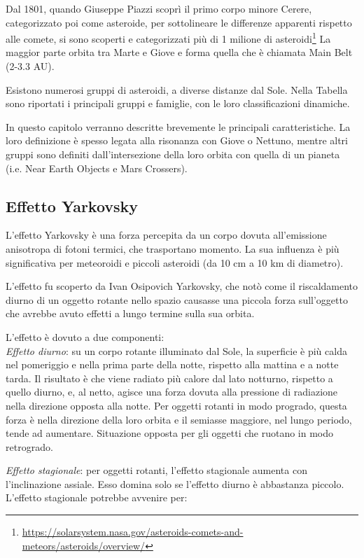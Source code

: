 \documentclass[a4paper,11pt,openright]{book}
\begin{document}
Dal 1801, quando Giuseppe Piazzi scoprì il primo corpo minore Cerere, categorizzato poi come asteroide, per sottolineare le differenze apparenti rispetto alle comete, si sono scoperti e categorizzati più di 1 milione di asteroidi\footnote{\href{https://solarsystem.nasa.gov/asteroids-comets-and-meteors/asteroids/overview/}{https://solarsystem.nasa.gov/asteroids-comets-and-meteors/asteroids/overview/}} La maggior parte orbita tra Marte e Giove e forma quella che è chiamata Main Belt (2-3.3 AU).

Esistono numerosi gruppi di asteroidi, a diverse distanze dal Sole. Nella Tabella sono riportati i principali gruppi e famiglie, con le loro classificazioni dinamiche.

In questo capitolo verranno descritte brevemente le principali caratteristiche. La loro definizione è spesso legata alla risonanza con Giove o Nettuno, mentre altri gruppi sono definiti dall'intersezione della loro orbita con quella di un pianeta (i.e. Near Earth Objects e Mars Crossers).

\subsection{Effetto Yarkovsky} %
L’effetto Yarkovsky è una forza percepita da un corpo dovuta all’emissione anisotropa di fotoni termici, che trasportano momento. La sua influenza è più significativa per meteoroidi e piccoli asteroidi (da 10 cm a 10 km di diametro).

L’effetto fu scoperto da Ivan Osipovich Yarkovsky, che notò come il riscaldamento diurno di un oggetto rotante nello spazio causasse una piccola forza sull’oggetto che avrebbe avuto effetti a lungo termine sulla sua orbita.

L’effetto è dovuto a due componenti:\\
\textit{Effetto diurno}: su un corpo rotante illuminato dal Sole, la superficie è più calda nel pomeriggio e nella prima parte della notte, rispetto alla mattina e a notte tarda. Il risultato è che viene radiato più calore dal lato notturno, rispetto a quello diurno, e, al netto, agisce una forza dovuta alla pressione di radiazione nella direzione opposta alla notte. Per oggetti rotanti in modo progrado, questa forza è nella direzione della loro orbita e il semiasse maggiore, nel lungo periodo, tende ad aumentare. Situazione opposta per gli oggetti che ruotano in modo retrogrado.


\textit{Effetto stagionale}: per oggetti rotanti, l’effetto stagionale aumenta con l’inclinazione assiale. Esso domina solo se l’effetto diurno è abbastanza piccolo.
L’effetto stagionale potrebbe avvenire per:
\end{document}
